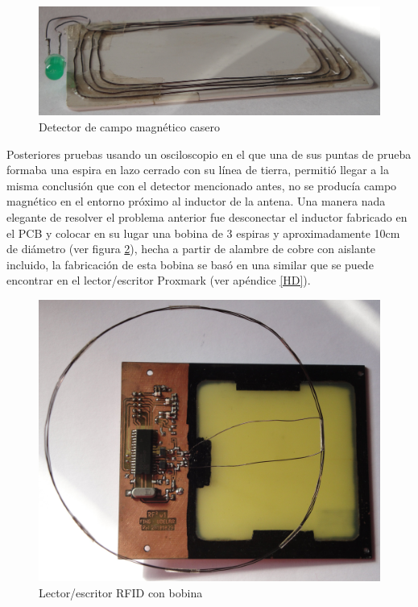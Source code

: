 \begin{figure}[H]
\centering
  \begin{center}
  \includegraphics[scale=.1]{Imagenes/detector.jpg}
  \end{center}
  \caption{Detector de campo magnético casero}\label{Fig:detector} 
\end{figure}


Posteriores pruebas usando un osciloscopio en el que una de sus puntas de prueba formaba una espira en lazo cerrado con su línea de tierra, permitió llegar a la misma conclusión que con el detector mencionado antes, no se producía campo magnético en el entorno próximo al inductor de la antena.  
Una manera nada elegante de resolver el problema anterior fue desconectar el inductor fabricado en el PCB y colocar en su lugar una bobina de 3 espiras y aproximadamente 10cm de diámetro (ver figura \ref{ant_rulo}), hecha a partir de alambre de cobre con aislante incluido, la fabricación de esta bobina se basó en una similar que se puede encontrar en el lector/escritor Proxmark \cite{Proxmark} (ver apéndice \ref{HD}). 

\begin{figure}[H]
\centering
  \begin{center}
  \includegraphics[scale=.1]{Imagenes/ant_rulo.jpg}
  \end{center}
  \caption{Lector/escritor RFID con bobina}\label{ant_rulo} 
\end{figure}

